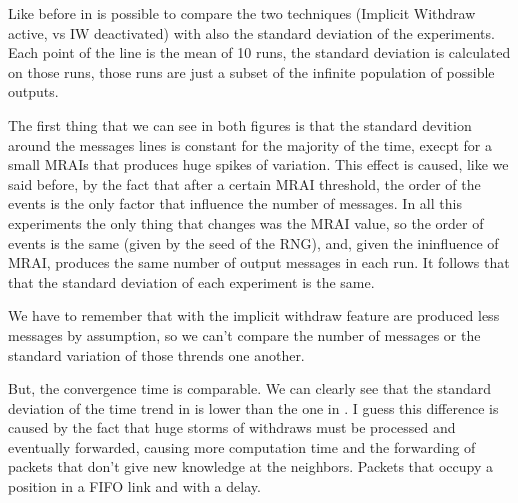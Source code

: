 \documentclass[10pt,conference,letterpaper]{IEEEtran}
\begin{document}
Like before in  is possible to compare the
two techniques (Implicit Withdraw active, vs IW deactivated) with also the 
standard deviation of the experiments.
Each point of the line is the mean of \num{10} runs, the standard deviation
is calculated on those runs, those runs are just a subset of the infinite population
of possible outputs.

The first thing that we can see in both figures is that the standard devition around 
the messages lines is constant for the majority of the time, execpt for a small
\ac{MRAI}s that produces huge spikes of variation.
This effect is caused, like we said before, by the fact that after a certain \ac{MRAI} 
threshold, the order of the events is the only factor that influence the number
of messages. In all this experiments the only thing that changes was the \ac{MRAI}
value, so the order of events is the same (given by the seed of the RNG), and,
given the ininfluence of \ac{MRAI}, produces the same number of output messages
in each run.
It follows that that the standard deviation of each experiment is the same.

We have to remember that with the implicit withdraw feature are produced less
messages by assumption, so we can't compare the number of messages or the standard
variation of those thrends one another.

But, the convergence time is comparable.
We can clearly see that the standard deviation of the time trend in 
 is lower than the one in 
.
I guess this difference is caused by the fact that huge storms of withdraws
must be processed and eventually forwarded, causing more computation time
and the forwarding of packets that don't give new knowledge at the neighbors.
Packets that occupy a position in a FIFO link and with a delay.
\end{document}
